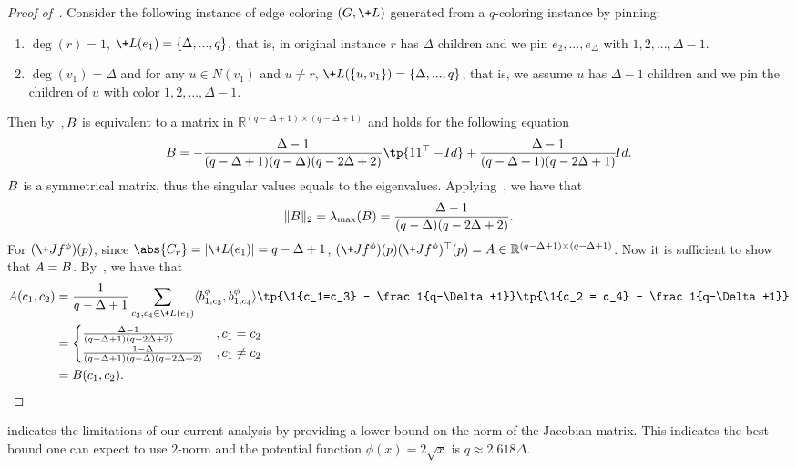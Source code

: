 \documentclass[a4paper,11pt]{article}
\begin{document}
\begin{proof}[Proof of~]
    Consider the following instance of edge coloring $(G,\+L)$ generated from a $q$-coloring instance by pinning:
    \begin{enumerate}
        \item $\deg(r) = 1$, $\+L(e_1) = \{\Delta,...,q\}$, that is, in original instance $r$ has $\Delta$ children and we pin $e_2,...,e_{\Delta}$ with $1,2,...,\Delta-1$.
        \item $\deg(v_1) = \Delta$ and for any $u\in N(v_1)$ and $u\neq r$, $\+L(\{u,v_1\}) = \{\Delta,...,q\}$, that is, we assume $u$ has $\Delta-1$ children and we pin the children of $u$ with color $1,2,...,\Delta-1$.
    \end{enumerate}
    Then by~$, \*B$ is equivalent to a matrix in $\mathbb{R}^{(q-\Delta+1)\times (q-\Delta+1)}$ and holds for the following equation
    $$
        \*B = -\frac{\Delta-1}{(q-\Delta+1)(q-\Delta)(q-2\Delta+2)}\tp{\*1\*1^\top - \!{Id}} + \frac{\Delta-1}{(q-\Delta+1)(q-2\Delta+1)}\!{Id}.
    $$
    $\*B$ is a symmetrical matrix, thus the singular values equals to the eigenvalues. 
    Applying~, we have that
    $$
        \|\*B\|_2 = \lambda_{\max}(\*B) = \frac{\Delta-1}{(q-\Delta)(q-2\Delta+2)}.
    $$
    For $(\+J f^\phi)(\*p)$, since $\abs{C_r} = |\+L(e_1)| = q-\Delta+1$, $(\+J f^\phi)(\*p)(\+J f^\phi)^\top(\*p) = \*A \in \mathbb{R}^{(q-\Delta+1)\times (q-\Delta+1)}$.
    Now it is sufficient to show that $\*A = \*B$.
    By~, we have that
    \begin{align*}
        \*A(c_1,c_2) &= \frac 1{q-\Delta+1}\sum_{c_3,c_4\in \+L(e_1)}\langle \*b^\phi_{1,c_3}, \*b^\phi_{1,c_4}\rangle\tp{\1{c_1=c_3} - \frac 1{q-\Delta+1}}\tp{\1{c_2 = c_4} - \frac 1{q-\Delta+1}}
        \\&= \begin{cases}
            \frac{\Delta-1}{(q-\Delta+1)(q-2\Delta+2)} &, c_1 = c_2
            \\\frac{1-\Delta}{(q-\Delta+1)(q-\Delta)(q-2\Delta+2)} &, c_1\neq c_2
        \end{cases}
        \\&= \*B(c_1,c_2).
    \end{align*}
\end{proof}
 indicates the limitations of our current analysis by providing a lower bound on the norm of the Jacobian matrix. This indicates the best bound one can expect to use $2$-norm and the potential function $\phi(x) = 2\sqrt{x}$ is $q\approx 2.618\Delta$.
\end{document}
